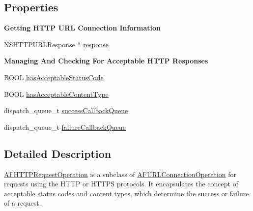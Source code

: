 \subsection*{Properties}
\begin{Indent}{\bf Getting H\-T\-T\-P U\-R\-L Connection Information}\par
{\em 

 

 }\begin{DoxyCompactItemize}
\item 
N\-S\-H\-T\-T\-P\-U\-R\-L\-Response $\ast$ \hyperlink{interface_a_f_h_t_t_p_request_operation_a7a6e0248cffbdfa767d79e864fc1e730}{response}
\end{DoxyCompactItemize}
\end{Indent}
\begin{Indent}{\bf Managing And Checking For Acceptable H\-T\-T\-P Responses}\par
{\em 

 

 }\begin{DoxyCompactItemize}
\item 
B\-O\-O\-L \hyperlink{interface_a_f_h_t_t_p_request_operation_a2535d0fb4cf31762e8da4d72b5b38884}{has\-Acceptable\-Status\-Code}
\item 
B\-O\-O\-L \hyperlink{interface_a_f_h_t_t_p_request_operation_aac3fa89cf863383420c3249f4039cdfa}{has\-Acceptable\-Content\-Type}
\item 
dispatch\-\_\-queue\-\_\-t \hyperlink{interface_a_f_h_t_t_p_request_operation_a54c7b52a48c9347ebe1782efd35a7709}{success\-Callback\-Queue}
\item 
dispatch\-\_\-queue\-\_\-t \hyperlink{interface_a_f_h_t_t_p_request_operation_af6b19034ba394439b4b66f662051149a}{failure\-Callback\-Queue}
\end{DoxyCompactItemize}
\end{Indent}


\subsection{Detailed Description}
{\ttfamily \hyperlink{interface_a_f_h_t_t_p_request_operation}{A\-F\-H\-T\-T\-P\-Request\-Operation}} is a subclass of {\ttfamily \hyperlink{interface_a_f_u_r_l_connection_operation}{A\-F\-U\-R\-L\-Connection\-Operation}} for requests using the H\-T\-T\-P or H\-T\-T\-P\-S protocols. It encapsulates the concept of acceptable status codes and content types, which determine the success or failure of a request. 

